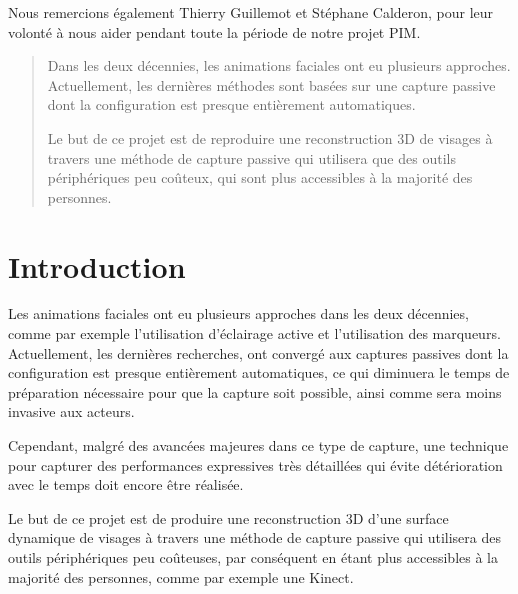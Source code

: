 \documentclass[a4paper,12pt]{article}
\begin{document}
Nous remercions également Thierry Guillemot et Stéphane Calderon, pour
leur volonté à nous aider pendant toute la période de notre projet PIM. 

\newpage
\thispagestyle{empty}
\begin{abstract}

Dans les deux décennies, les animations faciales ont eu plusieurs approches.
Actuellement, les dernières méthodes sont basées sur une capture
passive dont la configuration est presque entièrement automatiques. 

Le but de ce projet est de reproduire une reconstruction 3D de visages
à travers une méthode de capture passive qui utilisera que des outils
périphériques peu coûteux, qui sont plus accessibles à la majorité des
personnes. 

\end{abstract}


\newpage
\thispagestyle{empty}
\tableofcontents
\newpage
\setcounter{page}{1}

\section{Introduction}

Les animations faciales ont eu plusieurs approches dans les deux
décennies, comme par exemple l'utilisation d'éclairage active et
l'utilisation des marqueurs. Actuellement, les dernières recherches,
ont convergé aux captures passives dont la configuration est presque
entièrement automatiques, ce qui diminuera le temps de préparation
nécessaire pour que la capture soit possible, ainsi comme sera moins invasive aux
acteurs.

Cependant, malgré des avancées majeures dans ce type de capture, une
technique pour capturer des performances expressives très détaillées
qui évite détérioration avec le temps doit encore être réalisée.

Le but de ce projet est de produire une reconstruction 3D d'une
surface dynamique de visages à travers une méthode de capture passive
qui utilisera des outils périphériques peu coûteuses, par conséquent
en étant plus accessibles à la majorité des personnes, comme par
exemple une Kinect.


\end{document}
